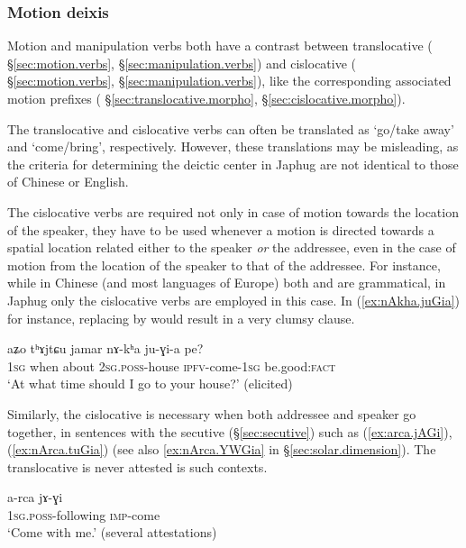 \subsubsection{Motion deixis} \label{sec:motion.deixis}
Motion and manipulation verbs both have a contrast between translocative ( §\ref{sec:motion.verbs},  §\ref{sec:manipulation.verbs}) and cislocative ( §\ref{sec:motion.verbs},  §\ref{sec:manipulation.verbs}), like the corresponding associated motion prefixes ( §\ref{sec:translocative.morpho},  §\ref{sec:cislocative.morpho}).

The translocative and cislocative verbs can often be translated as `go/take away' and `come/bring', respectively. However, these translations may be misleading, as the criteria for determining the deictic center in Japhug are not identical to those of Chinese or English.

The cislocative verbs are required not only in case of motion towards the location of the speaker, they have to be used whenever a motion is directed towards a spatial location related either to the speaker \textit{or} the addressee, even in the case of motion from the location of the speaker to that of the addressee. For instance, while in Chinese (and most languages of Europe) both  and  are  grammatical, in Japhug only the cislocative verbs are employed in this case. In (\ref{ex:nAkha.juGia}) for instance, replacing  by  would result in a very clumsy clause.

\begin{exe}
\ex \label{ex:nAkha.juGia}
\gll  aʑo tʰɤjtɕu jamar nɤ-kʰa ju-ɣi-a pe? \\
\textsc{1sg} when about \textsc{2sg}.\textsc{poss}-house \textsc{ipfv}-come-\textsc{1sg} be.good:\textsc{fact} \\
\glt  `At what time should I go to your house?' (elicited)
\end{exe}

Similarly, the cislocative is necessary when both addressee and speaker go together, in sentences with the secutive  (§\ref{sec:secutive}) such as (\ref{ex:arca.jAGi}), (\ref{ex:nArca.tuGia}) (see also \ref{ex:nArca.YWGia} in §\ref{sec:solar.dimension}). The translocative  is never attested is such contexts.

\begin{exe}
\ex \label{ex:arca.jAGi}
\gll  a-rca jɤ-ɣi  \\
\textsc{1sg}.\textsc{poss}-following \textsc{imp}-come  \\
\glt `Come with me.' (several attestations)
\end{exe}
 
